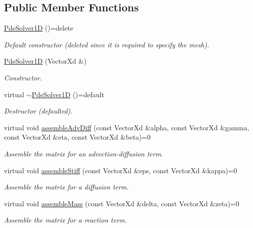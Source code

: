 \subsection*{Public Member Functions}
\begin{DoxyCompactItemize}
\item 
\hypertarget{classPdeSolver1D_a9e578d43e38517bade5c0911b7906e73}{\hyperlink{classPdeSolver1D_a9e578d43e38517bade5c0911b7906e73}{Pde\-Solver1\-D} ()=delete}\label{classPdeSolver1D_a9e578d43e38517bade5c0911b7906e73}

\begin{DoxyCompactList}\small\item\em Default constructor (deleted since it is required to specify the mesh). \end{DoxyCompactList}\item 
\hyperlink{classPdeSolver1D_a2fb4efbf180a22aa8d8404765a3a7aa5}{Pde\-Solver1\-D} (Vector\-Xd \&)
\begin{DoxyCompactList}\small\item\em Constructor. \end{DoxyCompactList}\item 
\hypertarget{classPdeSolver1D_ae52bcba084b9cc8daa575e3f06d9271a}{virtual \hyperlink{classPdeSolver1D_ae52bcba084b9cc8daa575e3f06d9271a}{$\sim$\-Pde\-Solver1\-D} ()=default}\label{classPdeSolver1D_ae52bcba084b9cc8daa575e3f06d9271a}

\begin{DoxyCompactList}\small\item\em Destructor (defaulted). \end{DoxyCompactList}\item 
virtual void \hyperlink{classPdeSolver1D_aa325f9e11f8b91cb22afca860888300d}{assemble\-Adv\-Diff} (const Vector\-Xd \&alpha, const Vector\-Xd \&gamma, const Vector\-Xd \&eta, const Vector\-Xd \&beta)=0
\begin{DoxyCompactList}\small\item\em Assemble the matrix for an advection-\/diffusion term. \end{DoxyCompactList}\item 
virtual void \hyperlink{classPdeSolver1D_af75110b5d68e91b62cfc3e7e4e969a32}{assemble\-Stiff} (const Vector\-Xd \&eps, const Vector\-Xd \&kappa)=0
\begin{DoxyCompactList}\small\item\em Assemble the matrix for a diffusion term. \end{DoxyCompactList}\item 
virtual void \hyperlink{classPdeSolver1D_aca065bfba5136470a4caf30fd7927e37}{assemble\-Mass} (const Vector\-Xd \&delta, const Vector\-Xd \&zeta)=0
\begin{DoxyCompactList}\small\item\em Assemble the matrix for a reaction term. \end{DoxyCompactList}\end{DoxyCompactItemize}
